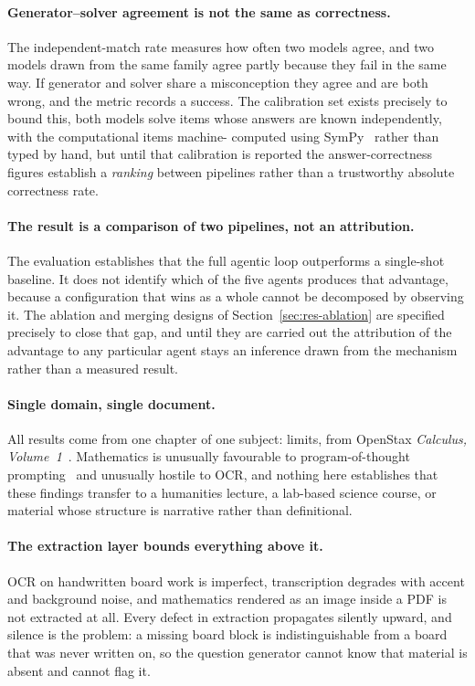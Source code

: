 \paragraph{Generator--solver agreement is not the same as correctness.} The
independent-match rate measures how often two models agree, and two models drawn from
the same family agree partly because they fail in the same way. If generator and
solver share a misconception they agree and are both wrong, and the metric records a
success. The calibration set exists precisely to bound this, both models solve
items whose answers are known independently, with the computational items machine-
computed using SymPy~\cite{sympy} rather than typed by hand, but until that
calibration is reported the answer-correctness figures establish a \emph{ranking}
between pipelines rather than a trustworthy absolute correctness rate.

\paragraph{The result is a comparison of two pipelines, not an attribution.} The
evaluation establishes that the full agentic loop outperforms a single-shot
baseline. It does not identify which of the five agents produces that advantage,
because a configuration that wins as a whole cannot be decomposed by observing
it. The ablation and merging designs of Section~\ref{sec:res-ablation} are
specified precisely to close that gap, and until they are carried out the
attribution of the advantage to any particular agent stays an inference drawn
from the mechanism rather than a measured result.

\paragraph{Single domain, single document.} All results come from one chapter of one
subject: limits, from OpenStax \emph{Calculus, Volume~1}~\cite{openstax_calculus}.
Mathematics is unusually favourable to program-of-thought
prompting~\cite{chen2023pot} and unusually hostile to OCR, and nothing here
establishes that these findings transfer to a humanities lecture, a lab-based
science course, or material whose structure is narrative rather than definitional.

\paragraph{The extraction layer bounds everything above it.} OCR on handwritten
board work is imperfect, transcription degrades with accent and background noise, and
mathematics rendered as an image inside a PDF is not extracted at all. Every defect
in extraction propagates silently upward, and silence is the problem: a missing board
block is indistinguishable from a board that was never written on, so the question
generator cannot know that material is absent and cannot flag it.

